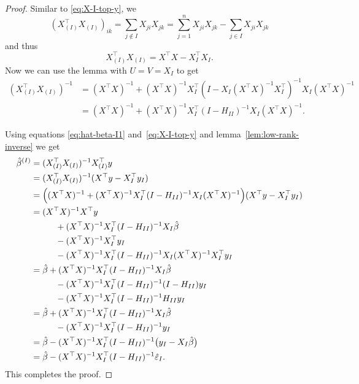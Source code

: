 \documentclass[
  a4paper,
]{article}
\theoremstyle{definition}
\theoremstyle{definition}
\theoremstyle{definition}
\theoremstyle{definition}
\theoremstyle{remark}
\begin{document}
\begin{proof}
Similar to \eqref{eq:X-I-top-y}, we
\begin{equation*}
  (X_{(I)}^\top X_{(I)})_{ik}
  = \sum_{j\notin I} X_{ji} X_{jk}
  = \sum_{j=1}^n X_{ji} X_{jk} - \sum_{j\in I} X_{ji} X_{jk}
\end{equation*}
and thus
\begin{equation*}
  X_{(I)}^\top X_{(I)}
  = X^\top X - X_I^\top X_I.
\end{equation*}
Now we can use the lemma with \(U = V = X_I\) to get
\begin{align*}
  (X_{(I)}^\top X_{(I)})^{-1}
  &= (X^\top X)^{-1} + (X^\top X)^{-1} X_I^\top (I - X_I (X^\top X)^{-1} X_I^\top)^{-1} X_I (X^\top X)^{-1} \\
  &= (X^\top X)^{-1} + (X^\top X)^{-1} X_I^\top (I - H_{II})^{-1} X_I (X^\top X)^{-1}.
\end{align*}

Using equations \eqref{eq:hat-beta-I1} and~\eqref{eq:X-I-top-y} and
lemma~\ref{lem:low-rank-inverse} we get
\begin{align*}
  \hat\beta^{(I)}
  &= (X_{(I)}^\top X_{(I)})^{-1} X_{(I)}^\top y \\
  &= (X_{(I)}^\top X_{(I)})^{-1} (X^\top y - X_I^\top y_I) \\
  &= \Bigl( (X^\top X)^{-1} + (X^\top X)^{-1} X_I^\top (I - H_{II})^{-1} X_I (X^\top X)^{-1} \Bigr) (X^\top y - X_I^\top y_I) \\
  &= (X^\top X)^{-1} X^\top y \\
    &\hskip1cm + (X^\top X)^{-1} X_I^\top (I - H_{II})^{-1} X_I \hat\beta \\
    &\hskip1cm - (X^\top X)^{-1} X_I^\top y_I \\
    &\hskip1cm - (X^\top X)^{-1} X_I^\top (I - H_{II})^{-1} X_I (X^\top X)^{-1} X_I^\top y_I \\
  &= \hat\beta
               + (X^\top X)^{-1} X_I^\top (I - H_{II})^{-1} X_I \hat\beta \\
    &\hskip1cm - (X^\top X)^{-1} X_I^\top (I - H_{II})^{-1} (I - H_{II}) y_I \\
    &\hskip1cm - (X^\top X)^{-1} X_I^\top (I - H_{II})^{-1} H_{II} y_I \\
  &= \hat\beta
               + (X^\top X)^{-1} X_I^\top (I - H_{II})^{-1} X_I \hat\beta \\
    &\hskip1cm - (X^\top X)^{-1} X_I^\top (I - H_{II})^{-1} y_I \\
  &= \hat\beta - (X^\top X)^{-1} X_I^\top (I - H_{II})^{-1} \bigl( y_I -  X_I \hat\beta \bigr) \\
  &= \hat\beta - (X^\top X)^{-1} X_I^\top (I - H_{II})^{-1} \hat\varepsilon_I.
\end{align*}
This completes the proof.
\end{proof}
\end{document}
